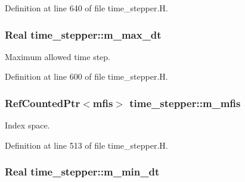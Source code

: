 Definition at line 640 of file time\+\_\+stepper.\+H.

\subsubsection[{\texorpdfstring{m\+\_\+max\+\_\+dt}{m_max_dt}}]{\setlength{\rightskip}{0pt plus 5cm}Real time\+\_\+stepper\+::m\+\_\+max\+\_\+dt\hspace{0.3cm}{\ttfamily [protected]}}\hypertarget{classtime__stepper_a0b4bb843a6ab96d3876aec7668d8ef31}{}\label{classtime__stepper_a0b4bb843a6ab96d3876aec7668d8ef31}


Maximum allowed time step. 



Definition at line 600 of file time\+\_\+stepper.\+H.

\subsubsection[{\texorpdfstring{m\+\_\+mfis}{m_mfis}}]{\setlength{\rightskip}{0pt plus 5cm}Ref\+Counted\+Ptr$<${\bf mfis}$>$ time\+\_\+stepper\+::m\+\_\+mfis\hspace{0.3cm}{\ttfamily [protected]}}\hypertarget{classtime__stepper_ac45b323d83c4085b3f704bf8ee7b9056}{}\label{classtime__stepper_ac45b323d83c4085b3f704bf8ee7b9056}


Index space. 



Definition at line 513 of file time\+\_\+stepper.\+H.

\subsubsection[{\texorpdfstring{m\+\_\+min\+\_\+dt}{m_min_dt}}]{\setlength{\rightskip}{0pt plus 5cm}Real time\+\_\+stepper\+::m\+\_\+min\+\_\+dt\hspace{0.3cm}{\ttfamily [protected]}}\hypertarget{classtime__stepper_abe8383e525fee7b34f17634d20b8dc7b}{}\label{classtime__stepper_abe8383e525fee7b34f17634d20b8dc7b}


